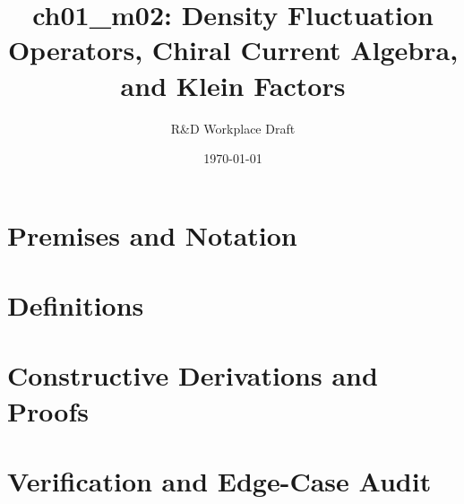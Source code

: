 \documentclass[11pt,a4paper]{article}
\title{\textbf{ch01\_m02: Density Fluctuation Operators, Chiral Current Algebra, and Klein Factors}}
\author{R\&D Workplace Draft}
\date{\today}
\theoremstyle{definition}
\theoremstyle{plain}
\theoremstyle{remark}
\begin{document}
\maketitle

\section{Premises and Notation}

\section{Definitions}

\section{Constructive Derivations and Proofs}

\section{Verification and Edge-Case Audit}
\end{document}
